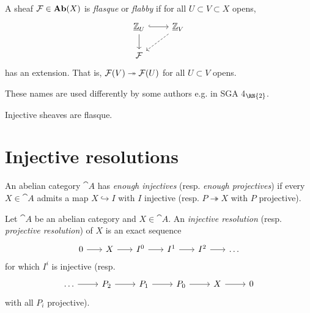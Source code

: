 \documentclass[../main.tex]{subfiles}
\begin{document}
\begin{defn}
    A sheaf $\mathcal F \in \mathbf{Ab}(X)$ is \emph{flasque} or \emph{flabby} if for all $U\subset V\subset X$ opens,
    \[\begin{tikzcd}
    	{\underline{\bb Z}_U} & {\underline{\bb Z}_V} \\
    	{\sh F}
    	\arrow[hook, from=1-1, to=1-2]
    	\arrow[from=1-1, to=2-1]
    	\arrow[dashed, from=1-2, to=2-1]
    \end{tikzcd}\]
    has an extension. That is, $\mathcal{F}(V) \twoheadrightarrow \mathcal F(U)$ for all $U\subset V$ opens. 
\end{defn}

\begin{rmk}
    These names are used differently by some authors e.g. in SGA 4$_{\RN{2}}$.
\end{rmk}

\begin{exmp}\label{exmp:injective-sheaves-are-flasque}
    Injective sheaves are flasque.
\end{exmp}

\section{Injective resolutions}


\begin{defn}
    An abelian category $\cat A$ has \emph{enough injectives} (resp. \emph{enough projectives}) if every $X\in \cat A$ admits a map $X\hookrightarrow I$ with $I$ injective (resp. $P\twoheadrightarrow X$ with $P$ projective).
\end{defn}

\begin{defn}
    Let $\cat A$ be an abelian category and $X\in \cat A$. An \emph{injective resolution}  (resp. \emph{projective resolution}) of $X$ is an exact sequence
    \[\begin{tikzcd}[column sep=scriptsize]
        0 \ar[r] & X \ar[r] & I^0 \ar[r] & I^1\ar[r] & I^2 \ar[r] & \dots
    \end{tikzcd}\]
    for which $I^i$ is injective (resp.
    \[\begin{tikzcd}
        \dots \ar[r] & P_2 \ar[r] & P_1 \ar[r] & P_0 \ar[r] & X \ar[r] & 0
    \end{tikzcd}\]
    with all $P_i$ projective).
\end{defn}
\end{document}
